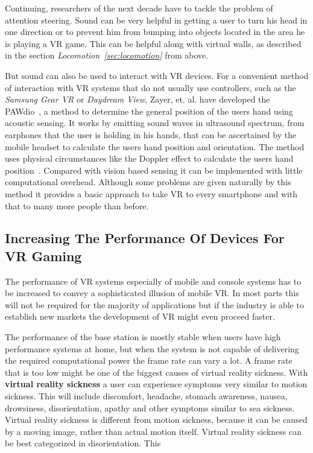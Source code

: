 Continuing, researchers of the next decade have to tackle the problem of attention steering. Sound can be very helpful in getting a user to turn his head in one direction or to prevent him from bumping into objects located in the area he is playing a VR game. This can be helpful along with virtual walls, as described in the section \textit{Locomotion~\ref{sec:locomotion}} from above.

But sound can also be used to interact with VR devices. For a convenient method of interaction with VR systems that do not usually use controllers, such as the \textit{Samsung Gear VR} or \textit{Daydream View}, Zayer, et. al. have developed the PAWdio~\cite{Zayer:2016:PHI:2967934.2968079}, a method to determine the general position of the users hand using acoustic sensing. It works by emitting sound waves in ultrasound spectrum, from earphones that the user is holding in his hands, that can be ascertained by the mobile headset to calculate the users hand position and orientation. The method uses physical circumstances like the Doppler effect to calculate the users hand position~\cite{Zayer:2016:PHI:2967934.2968079}. Compared with vision based sensing it can be implemented with little computational overhead. \newline
Although some problems are given naturally by this method it provides a basic approach to take VR to every smartphone and with that to many more people than before.

\subsection{Increasing The Performance Of Devices For VR Gaming}

The performance of VR systems especially of mobile and console systems has to be increased to convey a sophisticated illusion of mobile VR. In most parts this will not be required for the majority of applications but if the industry is able to establish new markets the development of VR might even proceed faster.

The performance of the base station is mostly stable when users have high performance systems at home, but when the system is not capable of delivering the required computational power the frame rate can vary a lot. \newline
A frame rate that is too low might be one of the biggest causes of virtual reality sickness. \newline
With \textbf{virtual reality sickness} a user can experience symptoms very similar to motion sickness. This will include discomfort, headache, stomach awareness, nausea, drowsiness, disorientation, apathy and other symptoms similar to sea sickness. Virtual reality sickness is different from motion sickness, because it can be caused by a moving image, rather than actual motion itself. Virtual reality sickness can be best categorized in disorientation. This 

